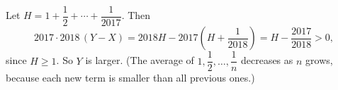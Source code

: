 Let $H=1+\dfrac12+\cdots+\dfrac1{2017}$. Then
\[2017\cdot2018\,(Y-X)=2018H-2017\left(H+\dfrac1{2018}\right)=H-\dfrac{2017}{2018}>0,\]
since $H\ge1$. So $\boxed{Y}$ is larger. (The average of $1,\dfrac12,\dots,\dfrac1n$ decreases as $n$ grows, because each new term is smaller than all previous ones.)
